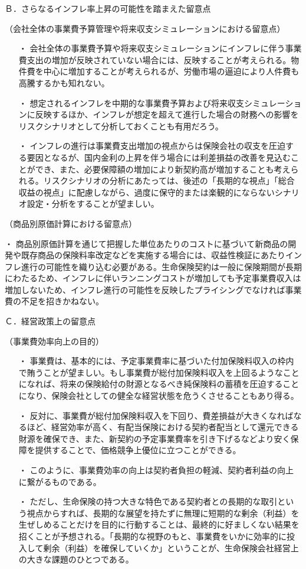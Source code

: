 \documentclass[report,gutter=10mm,fore-edge=10mm,uplatex,dvipdfmx]{jlreq}
\begin{document}
Ｂ．さらなるインフレ率上昇の可能性を踏まえた留意点

（会社全体の事業費予算管理や将来収支シミュレーションにおける留意点）

\begin{itemize}
 \item [・]  会社全体の事業費予算や将来収支シミュレーションにインフレに伴う事業費支出の増加が反映されていない場合には、反映することが考えられる。物件費を中心に増加することが考えられるが、労働市場の逼迫により人件費も高騰するかも知れない。
 \item [・]  想定されるインフレを中期的な事業費予算および将来収支シミュレーションに反映するほか、インフレが想定を超えて進行した場合の財務への影響をリスクシナリオとして分析しておくことも有用だろう。
 \item [・]  インフレの進行は事業費支出増加の視点からは保険会社の収支を圧迫する要因となるが、国内金利の上昇を伴う場合には利差損益の改善を見込むことができ、また、必要保障額の増加により新契約高が増加することも考えられる。リスクシナリオの分析にあたっては、後述の「長期的な視点」「総合収益の視点」に配慮しながら、過度に保守的または楽観的にならないシナリオ設定・分析をすることが望ましい。
\end{itemize}

（商品別原価計算における留意点）

・ 商品別原価計算を通じて把握した単位あたりのコストに基づいて新商品の開発や既存商品の保険料率改定などを実施する場合には、収益性検証にあたりインフレ進行の可能性を織り込む必要がある。生命保険契約は一般に保険期間が長期にわたるため、インフレに伴いランニングコストが増加しても予定事業費収入は増加しないため、インフレ進行の可能性を反映したプライシングでなければ事業費の不足を招きかねない。

Ｃ．経営政策上の留意点

（事業費効率向上の目的）

\begin{itemize}
 \item [・]  事業費は、基本的には、予定事業費率に基づいた付加保険料収入の枠内で賄うことが望ましい。もし事業費が総付加保険料収入を上回るようなことになれば、将来の保険給付の財源となるべき純保険料の蓄積を圧迫することになり、保険会社としての健全な経営状態を危うくさせることもあり得る。
 \item [・]  反対に、事業費が総付加保険料収入を下回り、費差損益が大きくなればなるほど、経営効率が高く、有配当保険における契約者配当として還元できる財源を確保でき、また、新契約の予定事業費率を引き下げるなどより安く保障を提供することで、価格競争上優位に立つことができる。
 \item [・]  このように、事業費効率の向上は契約者負担の軽減、契約者利益の向上に繋がるものである。
 \item [・]  ただし、生命保険の持つ大きな特色である契約者との長期的な取引という視点からすれば、長期的な展望を持たずに無理に短期的な剰余（利益）を生ぜしめることだけを目的に行動することは、最終的に好ましくない結果を招くことが予想される。「長期的な視野のもと、事業費をいかに効率的に投入して剰余（利益）を確保していくか」ということが、生命保険会社経営上の大きな課題のひとつである。
\end{itemize}
\end{document}

